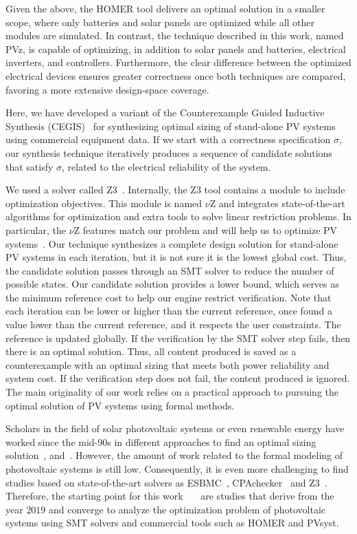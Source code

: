 \documentclass[journal]{IEEEtran}
\begin{document}
Given the above, the HOMER tool delivers an optimal solution in a smaller scope, where only batteries and solar panels are optimized while all other modules are simulated. In contrast, the technique described in this work, named PVz, is capable of optimizing, in addition to solar panels and batteries, electrical inverters, and controllers. Furthermore, the clear difference between the optimized electrical devices ensures greater correctness once both techniques are compared, favoring a more extensive design-space coverage.

Here, we have developed a variant of the Counterexample Guided Inductive Synthesis (CEGIS)~\cite{AbateCAV2018} for synthesizing optimal sizing of stand-alone PV systems using commercial equipment data. If we start with a correctness specification $\sigma$, our synthesis technique iteratively produces a sequence of candidate solutions that satisfy $\sigma$, related to the electrical reliability of the system.

We used a solver called Z3~\cite{BjornerPF15}. Internally, the Z3 tool contains a module to include optimization objectives. This module is named $\nu$Z and integrates state-of-the-art algorithms for optimization and extra tools to solve linear restriction problems. In particular, the $\nu$Z features match our problem and will help us to optimize PV systems~\cite{BjornerPF15}. Our technique synthesizes a complete design solution for stand-alone PV systems in each iteration, but it is not sure it is the lowest global cost. Thus, the candidate solution passes through an SMT solver to reduce the number of possible states. Our candidate solution provides a lower bound, which serves as the minimum reference cost to help our engine restrict verification. Note that each iteration can be lower or higher than the current reference, once found a value lower than the current reference, and it respects the user constraints. The reference is updated globally. If the verification by the SMT solver step fails, then there is an optimal solution. Thus, all content produced is saved as a counterexample with an optimal sizing that meets both power reliability and system cost. If the verification step does not fail, the content produced is ignored. The main originality of our work relies on a practical approach to pursuing the optimal solution of PV systems using formal methods. 
 
Scholars in the field of solar photovoltaic systems or even renewable energy have worked since the mid-90s in different approaches to find an optimal sizing solution~\cite{Driouich2018}, and~\cite{Applasamy2011}. However, the amount of work related to the formal modeling of photovoltaic systems is still low. Consequently, it is even more challenging to find studies based on state-of-the-art solvers as ESBMC~\cite{esbmc2018}, CPAchecker~\cite{Beyer2011} and Z3~\cite{BjornerPF15}. Therefore, the starting point for this work~\cite{VSTTE2020}~\cite{TrindadeCordeiro19}~\cite{AraujoBCF16} are studies that derive from the year $2019$ and converge to analyze the optimization problem of photovoltaic systems using SMT solvers and commercial tools such as HOMER and PVsyst. 
\end{document}

